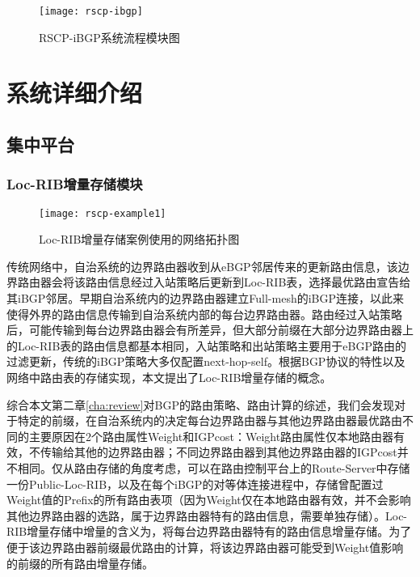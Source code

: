 \begin{figure}
  \centering
  \texttt{[image: rscp-ibgp]}
  \caption{RSCP-iBGP系统流程模块图}
  \label{fig:rscp-ibgp}
\end{figure}

\section{系统详细介绍}
\subsection{集中平台}
\subsubsection{Loc-RIB增量存储模块}

\begin{figure}
  \centering
  \texttt{[image: rscp-example1]}
  \caption{Loc-RIB增量存储案例使用的网络拓扑图}
  \label{fig:rscp-example1}
\end{figure}

传统网络中，自治系统的边界路由器收到从eBGP邻居传来的更新路由信息，该边界路由器会将该路由信息经过入站策略后更新到Loc-RIB表，选择最优路由宣告给其iBGP邻居。早期自治系统内的边界路由器建立Full-mesh的iBGP连接，以此来使得外界的路由信息传输到自治系统内部的每台边界路由器。路由经过入站策略后，可能传输到每台边界路由器会有所差异，但大部分前缀在大部分边界路由器上的Loc-RIB表的路由信息都基本相同，入站策略和出站策略主要用于eBGP路由的过滤更新，传统的iBGP策略大多仅配置next-hop-self。根据BGP协议的特性以及网络中路由表的存储实现，本文提出了Loc-RIB增量存储的概念。

综合本文第二章\ref{cha:review}对BGP的路由策略、路由计算的综述，我们会发现对于特定的前缀，在自治系统内的决定每台边界路由器与其他边界路由器最优路由不同的主要原因在2个路由属性Weight和IGPcost：Weight路由属性仅本地路由器有效，不传输给其他的边界路由器；不同边界路由器到其他边界路由器的IGPcost并不相同。仅从路由存储的角度考虑，可以在路由控制平台上的Route-Server中存储一份Public-Loc-RIB，以及在每个iBGP的对等体连接进程中，存储曾配置过Weight值的Prefix的所有路由表项（因为Weight仅在本地路由器有效，并不会影响其他边界路由器的选路，属于边界路由器特有的路由信息，需要单独存储）。Loc-RIB增量存储中增量的含义为，将每台边界路由器特有的路由信息增量存储。为了便于该边界路由器前缀最优路由的计算，将该边界路由器可能受到Weight值影响的前缀的所有路由增量存储。



